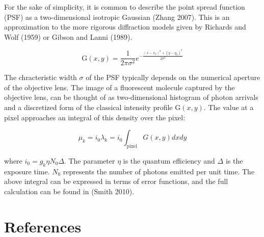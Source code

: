 \documentclass{ucetd}
\begin{document}
For the sake of simplicity, it is common to describe the point spread function (PSF) as a two-dimensional isotropic Gaussian (Zhang 2007). This is an approximation to the more rigorous diffraction models given by Richards and Wolf (1959) or Gibson and Lanni (1989). 

\begin{equation*}
\mathrm{G}(x,y) = \frac{1}{2\pi\sigma^{2}}e^{-\frac{(x-x_{0})^{2}+(y-y_{0})^{2}}{2\sigma^{2}}}
\end{equation*}

The chracteristic width $\sigma$ of the PSF typically depends on the numerical aperture of the objective lens. The image of a fluorescent molecule captured by the objective lens, can be thought of as two-dimensional histogram of photon arrivals and a discretized form of the classical intensity profile $\mathrm{G}(x,y)$. The value at a pixel approaches an integral of this density over the pixel:

\begin{equation}
\mu_{k} = i_{0}\lambda_{k} = i_{0}\int_{\mathrm{pixel}} G(x,y)dxdy
\end{equation}

where $i_{0} = g_{k}\eta N_{0}\Delta$. The parameter $\eta$ is the quantum efficiency and $\Delta$ is the exposure time. $N_{0}$ represents the number of photons emitted per unit time. The above integral can be expressed in terms of error functions, and the full calculation can be found in (Smith 2010). 

\section{References}
\end{document}
